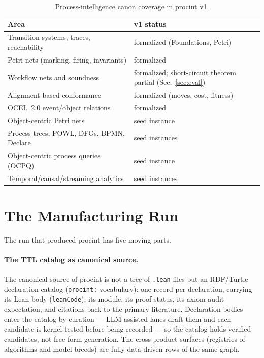 \documentclass[11pt]{article}
\begin{document}
\begin{table}[h]
\centering
\small
\begin{tabular}{ll}
\toprule
Area & v1 status \\
\midrule
Transition systems, traces, reachability & formalized (Foundations, Petri) \\
Petri nets (marking, firing, invariants) & formalized \\
Workflow nets and soundness & formalized; short-circuit theorem partial (Sec.~\ref{sec:eval}) \\
Alignment-based conformance & formalized (moves, cost, fitness) \\
OCEL~2.0 event/object relations & formalized \\
Object-centric Petri nets & seed instance \\
Process trees, POWL, DFGs, BPMN, Declare & seed instances \\
Object-centric process queries (OCPQ) & seed instance \\
Temporal/causal/streaming analytics & seed instances \\
\bottomrule
\end{tabular}
\caption{Process-intelligence canon coverage in \textsf{procint} v1.}
\label{tab:canon}
\end{table}

\section{The Manufacturing Run}
\label{sec:run}

The run that produced \textsf{procint} has five moving parts.

\paragraph{The TTL catalog as canonical source.}
The canonical source of \textsf{procint} is not a tree of \texttt{.lean}
files but an RDF/Turtle declaration catalog (\texttt{procint:} vocabulary):
one record per declaration, carrying its Lean body (\texttt{leanCode}),
its module, its proof status, its axiom-audit expectation, and citations
back to the primary literature. Declaration bodies enter the catalog by
curation --- LLM-assisted lanes draft them and each candidate is
kernel-tested before being recorded --- so the catalog holds verified
candidates, not free-form generation. The cross-product surfaces
(registries of algorithms and model breeds) are fully data-driven rows of
the same graph.
\end{document}
